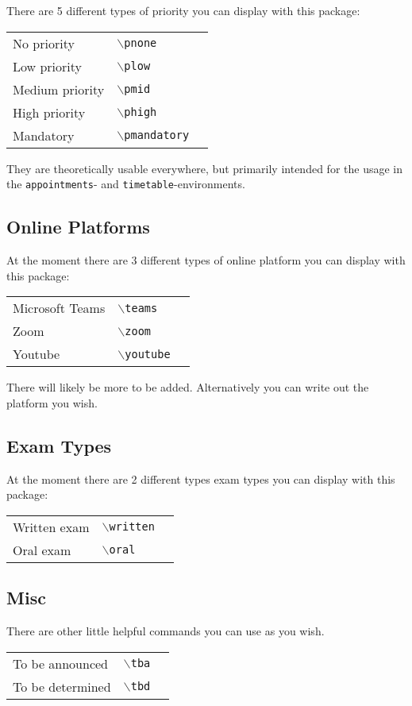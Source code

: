 \documentclass{article}
\newcommand{\cmd}[1]{$\backslash$\texttt{{#1}}}
\begin{document}
	There are 5 different types of priority you can display with this package:
	\begin{center}
		\begin{tabular}{lll}
			No priority&\cmd{pnone}&\pnone\\
			Low priority&\cmd{plow}&\plow\\
			Medium priority&\cmd{pmid}&\pmid\\
			High priority&\cmd{phigh}&\phigh\\
			Mandatory&\cmd{pmandatory}&\pmandatory\\
		\end{tabular}
	\end{center}
	They are theoretically usable everywhere, but primarily intended for the usage in the \texttt{appointments}- and \texttt{timetable}-environments. 

	
	\subsection{Online Platforms}
	\label{online}
	At the moment there are 3 different types of online platform you can display with this package:
	\begin{center}
		\begin{tabular}{lll}
			Microsoft Teams&\cmd{teams}&\teams\\
			Zoom&\cmd{zoom}&\zoom\\
			Youtube&\cmd{youtube}&\youtube\\
		\end{tabular}
	\end{center}
	There will likely be more to be added. Alternatively you can write out the platform you wish.
	
	\subsection{Exam Types}
	\label{examtypes}
	At the moment there are 2 different types exam types you can display with this package:
	\begin{center}
		\begin{tabular}{lll}
			Written exam&\cmd{written}&\written\\
			Oral exam&\cmd{oral}&\oral\\
		\end{tabular}
	\end{center}

	\subsection{Misc}
	\label{misc}
	There are other little helpful commands you can use as you wish.
	\begin{center}
		\begin{tabular}{lll}
			To be announced&\cmd{tba}&\tba\\
			To be determined&\cmd{tbd}&\tbd\\
		\end{tabular}
	\end{center}
\end{document}
